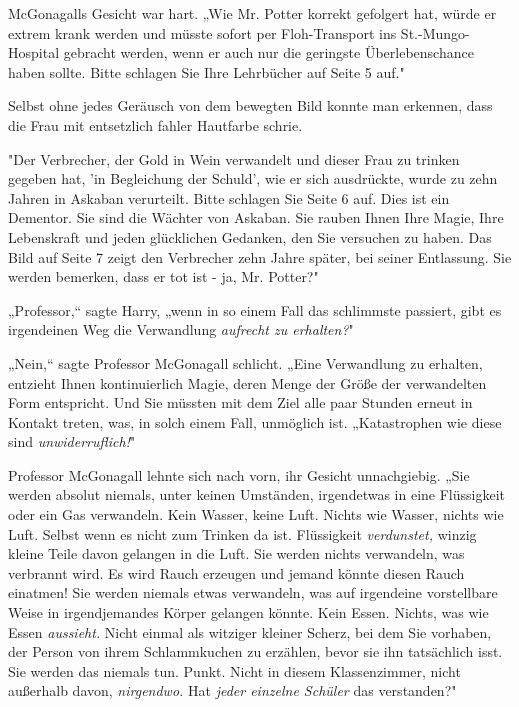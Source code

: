{McGonagalls Gesicht war hart. „Wie Mr. Potter korrekt gefolgert hat, würde er extrem krank werden und müsste sofort per Floh-Transport ins St.-Mungo-Hospital gebracht werden, wenn er auch nur die geringste Überlebenschance haben sollte. Bitte schlagen Sie Ihre Lehrbücher auf Seite 5 auf."

Selbst ohne jedes Geräusch von dem bewegten Bild konnte man erkennen, dass die Frau mit entsetzlich fahler Hautfarbe schrie.

"Der Verbrecher, der Gold in Wein verwandelt und dieser Frau zu trinken gegeben hat, 'in Begleichung der Schuld', wie er sich ausdrückte, wurde zu zehn Jahren in Askaban verurteilt. Bitte schlagen Sie Seite 6 auf. Dies ist ein Dementor. Sie sind die Wächter von Askaban. Sie rauben Ihnen Ihre Magie, Ihre Lebenskraft und jeden glücklichen Gedanken, den Sie versuchen zu haben. Das Bild auf Seite 7 zeigt den Verbrecher zehn Jahre später, bei seiner Entlassung. Sie werden bemerken, dass er tot ist - ja, Mr. Potter?"

„Professor,“ sagte Harry, „wenn in so einem Fall das schlimmste passiert, gibt es irgendeinen Weg die Verwandlung \emph{aufrecht zu erhalten?}"

„Nein,“ sagte Professor McGonagall schlicht. „Eine Verwandlung zu erhalten, entzieht Ihnen kontinuierlich Magie, deren Menge der Größe der verwandelten Form entspricht. Und Sie müssten mit dem Ziel alle paar Stunden erneut in Kontakt treten, was, in solch einem Fall, unmöglich ist. „Katastrophen wie diese sind \emph{unwiderruflich!}"

Professor McGonagall lehnte sich nach vorn, ihr Gesicht unnachgiebig. „Sie werden absolut niemals, unter keinen Umständen, irgendetwas in eine Flüssigkeit oder ein Gas verwandeln. Kein Wasser, keine Luft. Nichts wie Wasser, nichts wie Luft. Selbst wenn es nicht zum Trinken da ist. Flüssigkeit \emph{verdunstet,} winzig kleine Teile davon gelangen in die Luft. Sie werden nichts verwandeln, was verbrannt wird. Es wird Rauch erzeugen und jemand könnte diesen Rauch einatmen! Sie werden niemals etwas verwandeln, was auf irgendeine vorstellbare Weise in irgendjemandes Körper gelangen könnte. Kein Essen. Nichts, was wie Essen \emph{aussieht.} Nicht einmal als witziger kleiner Scherz, bei dem Sie vorhaben, der Person von ihrem Schlammkuchen zu erzählen, bevor sie ihn tatsächlich isst. Sie werden das niemals tun. Punkt. Nicht in diesem Klassenzimmer, nicht außerhalb davon, \emph{nirgendwo.} Hat \emph{jeder einzelne Schüler} das verstanden?"

}
